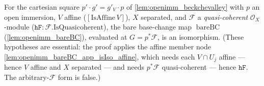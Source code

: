 \begin{lemma}\leanok
  \label{lem:openimm_bareBC_isIso}
  For the cartesian square \(p' \cdot g' = g'_V \cdot p\) of \cref{lem:openimm_beckchevalley} with
  \(p\) an open immersion, \(V\) affine (\([\mathrm{IsAffine}\,V]\)), \(X\) separated, and
  \(\mathcal{F}\) a \emph{quasi-coherent} \(\mathcal{O}_X\)-module
  (\(\mathtt{hF} : \mathcal{F}.\mathrm{IsQuasicoherent}\)), the bare base-change map
  \(\operatorname{bareBC}\) (\cref{lem:openimm_bareBC}), evaluated at \(G = p^*\mathcal{F}\), is an
  isomorphism. (These hypotheses are essential: the proof applies the affine member node
  \cref{lem:openimm_bareBC_app_isIso_affine}, which needs each \(V \cap U_j\) affine ---
  hence \(V\) affine and \(X\) separated --- and needs \(p^*\mathcal{F}\) quasi-coherent ---
  hence \(\mathtt{hF}\). The arbitrary-\(\mathcal{F}\) form is false.)
\end{lemma}
